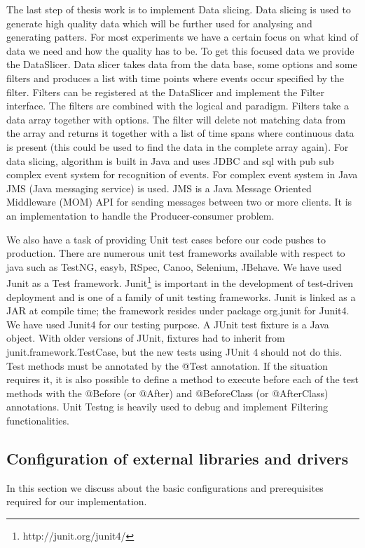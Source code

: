 \documentclass[article,type=msc,colorback,accentcolor=tud9c,twoside,11pt]{tudthesis}
\begin{document}
The last step of thesis work is to implement Data slicing. Data slicing is used to generate high quality data which will be further used for analysing and generating patters. For most experiments we have a certain focus on what kind of data we need and how the quality has to be. To get this focused data we provide the DataSlicer. Data slicer takes data from the data base, some options and some filters and produces a list with time points where events occur specified by the filter. Filters can be registered at the DataSlicer and implement the Filter interface. The filters are combined with the logical and paradigm. Filters take a data array together with options. The filter will delete not matching data from the array and returns it together with a list of time spans where continuous data is present (this could be used to find the data in the complete array again). For data  slicing, algorithm is built in Java and uses JDBC and sql with pub sub complex event system for recognition of events. For complex event system in Java JMS (Java messaging service) is used. JMS is a Java Message Oriented Middleware (MOM) API for sending messages between two or more clients. It is an implementation to handle the Producer-consumer problem.

We also have a task of providing Unit test cases before our code pushes to production. There are numerous unit test frameworks available with respect to java such as TestNG, easyb, RSpec, Canoo, Selenium, JBehave. We have used Junit as a Test framework. Junit\footnote{http://junit.org/junit4/} is important in the development of test-driven deployment and is one of a family of unit testing frameworks. Junit is linked as a JAR at compile time; the framework resides under package org.junit for Junit4. We have used Junit4 for our testing purpose. A JUnit test fixture is a Java object. With older versions of JUnit, fixtures had to inherit from junit.framework.TestCase, but the new tests using JUnit 4 should not do this. Test methods must be annotated by the @Test annotation. If the situation requires it, it is also possible to define a method to execute before  each of the test methods with the @Before (or @After) and @BeforeClass (or @AfterClass) annotations. Unit Testng is heavily used to debug and implement Filtering functionalities.
\clearpage

\subsection{Configuration of external libraries and drivers}
In this section we discuss about the basic configurations and prerequisites required for our implementation.
\end{document}
